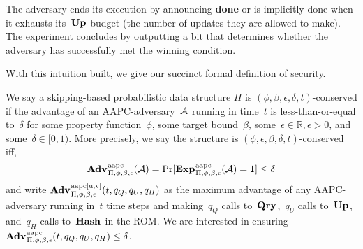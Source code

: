 The adversary ends its execution by announcing \textbf{done} or is implicitly done when it exhausts its~$\textup{\textbf{Up}}\hspace{0.5pt}$ budget (the number of updates they are allowed to make). The experiment concludes by outputting a bit that determines whether the adversary has successfully met the winning condition.

With this intuition built, we give our succinct formal definition of security. 

\begin{definition}\label{def:aapc}
    We say a skipping-based probabilistic data structure $\Pi$ is $(\phi,\beta,\epsilon,\delta,t)$-conserved if the advantage of an AAPC-adversary~$\mathcal{A}$ running in time~$t$ is less-than-or-equal to~$\delta$ for some property function~$\phi$, some target bound~$\beta$, some~$\epsilon \in \mathbb{R}, \epsilon > 0$, and some~$\delta \in [0,1)$. More precisely, we say the structure is $(\phi,\epsilon,\beta,\delta,t)$-conserved iff,
    \[ \Adv{\text{aapc}}_{\struct, \phi, \beta,\epsilon}(\advA) = \Pr[\Exp{\text{aapc}}_{\struct, \phi, \beta,\epsilon}(\advA) =1] \leq \delta
    \]
    and write $\Adv{\text{aapc}[u,v]}_{\struct, \phi, \beta, \epsilon}(t,q_Q,q_U,q_H)$ as the maximum advantage of any AAPC-adversary running in~$t$ time steps and making~$q_Q$ calls to~$\textup{\textbf{Qry}}\hspace{0.5pt}$,~$q_U$ calls to~$\textup{\textbf{Up}}\hspace{0.5pt}$, and~$q_H$ calls to~$\textup{\textbf{Hash}}\hspace{0.5pt}$ in the ROM. We are interested in ensuring  $\Adv{\text{aapc}}_{\struct, \phi, \beta,\epsilon}(t,q_Q,q_U,q_H) \leq \delta$.
\end{definition}
